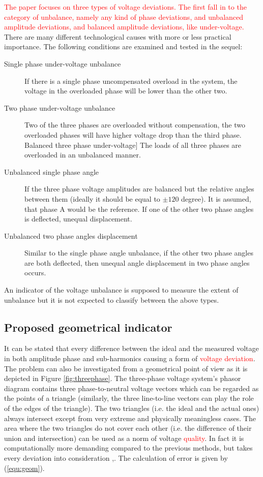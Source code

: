         \textcolor{red}{The paper focuses on three types of voltage deviations. The first fall in to the category of unbalance, namely any kind of phase deviations, and unbalanced amplitude deviations, and balanced amplitude deviations, like under-voltage.} There are many different technological causes with more or less practical importance. The following conditions are examined and tested in the sequel:
        \begin{description}
        \item[Single phase under-voltage unbalance]  If there is a single phase uncompensated overload in the system, the voltage in the overloaded phase will be lower than the other two.
        \item[Two phase under-voltage unbalance]  Two of the three phases are overloaded without compensation, the two overloaded phases will have higher voltage drop than the third phase.
        Balanced three phase under-voltage]  The loads of all three phases are overloaded in an unbalanced manner.
        \item[Unbalanced single phase angle]  If the three phase voltage amplitudes are balanced but the relative angles between them (ideally it should be equal to $\pm120$ degree). It is assumed, that phase A would be the reference. If one of the other two phase angles is deflected, unequal displacement.
        \item[Unbalanced two phase angles displacement] Similar to the single phase angle unbalance, if the other two phase angles are both deflected, then unequal angle displacement in two phase angles occurs.
        \end{description}
        An indicator of the voltage unbalance is supposed to measure the extent of unbalance but it is not expected to classify between the above types.

        

        \subsection{Proposed geometrical indicator}

            It can be stated that every difference between the ideal and the measured voltage in both amplitude phase and sub-harmonics causing a form of \textcolor{red}{voltage deviation}. The problem can also be investigated from a geometrical point of view as it is depicted in Figure \ref{fig:threephase}. The three-phase voltage system's phasor diagram contains three  phase-to-neutral voltage vectors which can be regarded as the points of a triangle (similarly, the three line-to-line vectors can play the role of the edges of the triangle). The two triangles (i.e. the ideal and the actual ones) always intersect except from very extreme and physically meaningless cases. The area where the two triangles do not cover each other (i.e. the difference of their union and intersection) can be used as a norm of voltage \textcolor{red}{quality}. In fact it is computationally more demanding compared to the previous methods, but takes every deviation into consideration \cite{Neukirchner2015},\cite{neukirchner2015examination}. The calculation of error is given by (\ref{equ:geom}).

